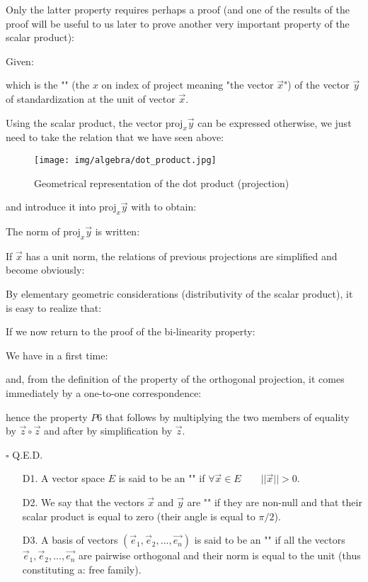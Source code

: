 	Only the latter property requires perhaps a proof (and one of the results of the proof  will be useful to us later to prove another very important property of the scalar product):
	\begin{dem}
	Given:
	
	which is the "\label{orthogonal projection vector}" (the $x$ on index of $\text{project}$ meaning "the vector $\vec{x}$") of the vector $\vec{y}$ of standardization at the unit of vector $\vec{x}$.
	
	Using the scalar product, the vector $\text{proj}_x\vec{y}$ can be expressed otherwise, we just need to take the relation that we have seen above:
	\begin{figure}[H]
		\centering
		\texttt{[image: img/algebra/dot\_product.jpg]}
		\caption{Geometrical representation of the dot product (projection)}
	\end{figure}
	
	and introduce it into $\text{proj}_x\vec{y}$ with to obtain:
	
	The norm of $\text{proj}_x\vec{y}$ is written:
	
	If $\vec{x}$ has a unit norm, the relations of previous projections are simplified and become obviously:
	
	By elementary geometric considerations (distributivity of the scalar product), it is easy to realize that:
	
	If we now return to the proof of the bi-linearity property:
	
	We have in a first time:
	
	and, from the definition of the property of the orthogonal projection, it comes immediately by a one-to-one correspondence:
	
	hence the property $P6$ that follows by multiplying the two members of equality by $\vec{z}\circ\vec{z}$ and after by simplification by $\vec{z}$.
	\begin{flushright}
		$\square$  Q.E.D.
	\end{flushright}
	\end{dem}
	\begin{enumerate}
		\item[D1.] A vector space $E$ is said to be an "" if $\forall \vec{x} \in E \qquad ||\vec{x}||>0$.
		
		\item[D2.] We say that the vectors $\vec{x}$ and $\vec{y}$ are "" if they are non-null and that their scalar product is equal to zero (their angle is equal to $\pi/2$).
		
		\item[D3.] A basis of vectors $(\vec{e}_1,\vec{e}_2,...,\vec{e_n})$ is said to be an "" if all the vectors $\vec{e}_1,\vec{e}_2,...,\vec{e_n}$ are pairwise orthogonal and their norm is equal to the unit (thus constituting a: free family).
	\end{enumerate}
